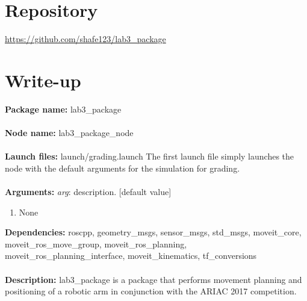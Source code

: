 \documentclass[12pt,letterpaper]{article}
\newcommand\packagename{lab3\_package}
\begin{document}
\section*{Repository}
\url{https://github.com/shafe123/lab3_package}

\section*{Write-up}

\textbf{Package name:} \packagename \\\\
\textbf{Node name:} \packagename\_node \\\\
\textbf{Launch files:}  launch/grading.launch
The first launch file simply launches the node with the default arguments for the simulation for grading. \\\\
\textbf{Arguments:}  \emph{arg}: description. [default value]
\begin{enumerate}
    \item None
\end{enumerate}
\textbf{Dependencies:}  roscpp, geometry\_msgs, sensor\_msgs, std\_msgs, moveit\_core, moveit\_ros\_move\_group, moveit\_ros\_planning, moveit\_ros\_planning\_interface, moveit\_kinematics, tf\_conversions \\\\
\textbf{Description:}  \packagename \hspace{1pt} is a package that performs movement planning and positioning of a robotic arm in conjunction with the ARIAC 2017 competition.
\end{document}
